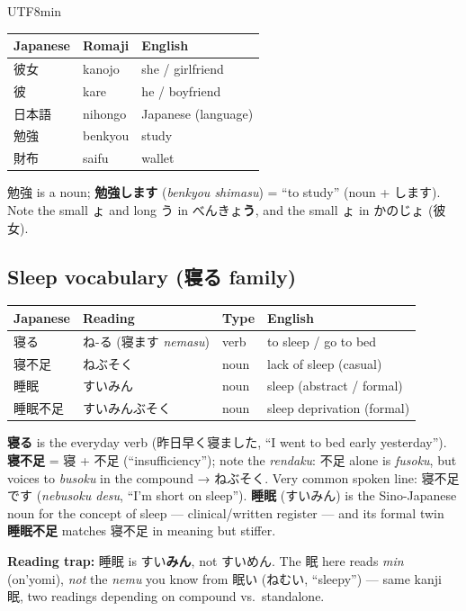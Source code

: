 \documentclass[11pt]{article}
\begin{document}
\begin{CJK}{UTF8}{min}
\begin{center}
\begin{tabular}{@{}lll@{}}
\toprule
Japanese & Romaji & English \\
\midrule
彼女     & kanojo        & she / girlfriend \\
彼       & kare          & he / boyfriend \\
日本語   & nihongo       & Japanese (language) \\
勉強     & benkyou       & study \\
財布     & saifu         & wallet \\
\bottomrule
\end{tabular}
\end{center}
勉強 is a noun; \textbf{勉強します} (\emph{benkyou shimasu}) = ``to study''
(noun + します). Note the small ょ and long う in べんきょ\textbf{う}, and the small
ょ in かのじょ (彼女).

\subsection{Sleep vocabulary (\texorpdfstring{寝る}{neru} family)}
\begin{center}
\begin{tabular}{@{}llll@{}}
\toprule
Japanese & Reading & Type & English \\
\midrule
寝る     & ね-る (寝ます \emph{nemasu}) & verb & to sleep / go to bed \\
寝不足   & ねぶそく                      & noun & lack of sleep (casual) \\
睡眠     & すいみん                      & noun & sleep (abstract / formal) \\
睡眠不足 & すいみんぶそく                & noun & sleep deprivation (formal) \\
\bottomrule
\end{tabular}
\end{center}
\textbf{寝る} is the everyday verb (昨日早く寝ました, ``I went to bed early
yesterday''). \textbf{寝不足} = 寝 + 不足 (``insufficiency''); note the
\emph{rendaku}: 不足 alone is \emph{fusoku}, but voices to \emph{busoku} in the
compound → ねぶそく. Very common spoken line: 寝不足です (\emph{nebusoku desu},
``I'm short on sleep''). \textbf{睡眠} (すいみん) is the Sino-Japanese noun for
the concept of sleep --- clinical/written register --- and its formal twin
\textbf{睡眠不足} matches 寝不足 in meaning but stiffer.

\textbf{Reading trap:} 睡眠 is すい\textbf{みん}, not すいめん. The 眠 here reads
\emph{min} (on'yomi), \emph{not} the \emph{nemu} you know from 眠い (ねむい,
``sleepy'') --- same kanji 眠, two readings depending on compound vs.\ standalone.


\end{CJK}
\end{document}

